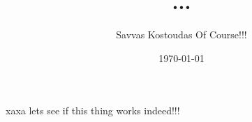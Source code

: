 \documentclass{article}
\begin{document}
\title{...}
\author{Savvas Kostoudas Of Course!!!}
\date{\today}

xaxa lets see if this thing works indeed!!!
\end{document}
